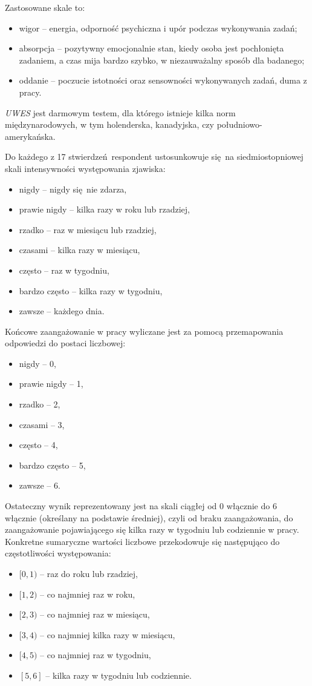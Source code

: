 Zastosowane skale to:
\begin{itemize}
\item wigor -- energia, odporność psychiczna i upór podczas wykonywania zadań;
\item absorpcja -- pozytywny emocjonalnie stan, kiedy osoba jest pochłonięta zadaniem, a czas mija bardzo szybko, w niezauważalny sposób dla badanego;
\item oddanie -- poczucie istotności oraz sensowności wykonywanych zadań, duma z pracy.
\end{itemize}

\emph{UWES} jest darmowym testem, dla którego istnieje kilka norm międzynarodowych, w tym holenderska, kanadyjska, czy południowo-amerykańska. 

Do każdego z 17 stwierdzeń respondent ustosunkowuje się na siedmiostopniowej skali intensywności występowania zjawiska:
\begin{itemize}
\item nigdy -- nigdy się nie zdarza,
\item prawie nigdy -- kilka razy w roku lub rzadziej,
\item rzadko -- raz w miesiącu lub rzadziej,
\item czasami -- kilka razy w miesiącu,
\item często -- raz w tygodniu,
\item bardzo często -- kilka razy w tygodniu,
\item zawsze -- każdego dnia.
\end{itemize}

Końcowe zaangażowanie w pracy wyliczane jest za pomocą przemapowania odpowiedzi do postaci liczbowej:
\begin{itemize}
\item nigdy -- 0,
\item prawie nigdy -- 1,
\item rzadko -- 2,
\item czasami -- 3,
\item często -- 4,
\item bardzo często -- 5,
\item zawsze -- 6.
\end{itemize}

Ostateczny wynik reprezentowany jest na skali ciągłej od 0 włącznie do 6 włącznie (określany na podstawie średniej), czyli od braku zaangażowania, do zaangażowanie pojawiającego się kilka razy w tygodniu lub codziennie w pracy. Konkretne sumaryczne wartości liczbowe przekodowuje się następująco do częstotliwości występowania: 
\begin{itemize}
  \item $[0, 1)$ -- raz do roku lub rzadziej,
  \item $[1, 2)$ -- co najmniej raz w roku,
  \item $[2, 3)$ -- co najmniej raz w miesiącu,
  \item $[3, 4)$ -- co najmniej kilka razy w miesiącu,
  \item $[4, 5)$ -- co najmniej raz w tygodniu,
  \item $[5, 6]$ -- kilka razy w tygodniu lub codziennie.
\end{itemize}

